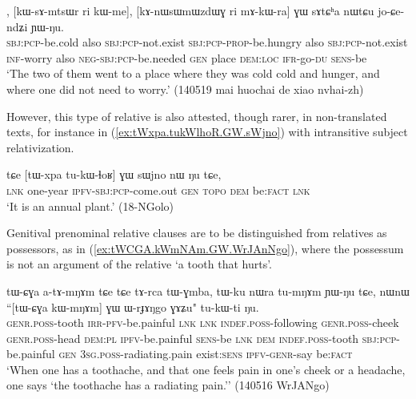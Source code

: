 \begin{exe}
\ex \label{ex:makWra.GW.sAtCha}
\gll [kɯ-ɣɤndʐo ri kɯ-me], [kɯ-sɤ-mtsɯr ri kɯ-me], [kɤ-nɯsɯmɯzdɯɣ ri mɤ-kɯ-ra] ɣɯ sɤtɕʰa nɯtɕu jo-ɕe-ndʑi ɲɯ-ŋu. \\
\textsc{sbj}:\textsc{pcp}-be.cold also \textsc{sbj}:\textsc{pcp}-not.exist \textsc{sbj}:\textsc{pcp}-\textsc{prop}-be.hungry also \textsc{sbj}:\textsc{pcp}-not.exist \textsc{inf}-worry also \textsc{neg}-\textsc{sbj}:\textsc{pcp}-be.needed \textsc{gen} place \textsc{dem}:\textsc{loc} \textsc{ifr}-go-\textsc{du} \textsc{sens}-be \\
\glt  `The two of them went to a place where they was cold cold and hunger, and where one did not need to worry.' (140519 mai huochai de xiao nvhai-zh)
\end{exe}

However, this type of relative is also attested, though rarer, in non-translated texts, for instance in (\ref{ex:tWxpa.tukWlhoR.GW.sWjno}) with intransitive subject relativization.
 

\begin{exe}
\ex \label{ex:tWxpa.tukWlhoR.GW.sWjno}
\gll  tɕe [tɯ-xpa tu-kɯ-ɬoʁ] ɣɯ sɯjno nɯ ŋu tɕe, \\
\textsc{lnk} one-year \textsc{ipfv}-\textsc{sbj}:\textsc{pcp}-come.out \textsc{gen}  \textsc{topo} \textsc{dem} be:\textsc{fact} \textsc{lnk} \\
\glt  `It is an annual plant.' (18-NGolo)
\end{exe}

Genitival prenominal relative clauses are to be distinguished from relatives as possessors, as in (\ref{ex:tWCGA.kWmNAm.GW.WrJAnNgo}), where the possessum   is not an argument of the relative  `a tooth that hurts'. 

\begin{exe}
\ex \label{ex:tWCGA.kWmNAm.GW.WrJAnNgo}
\gll tɯ-ɕɣa a-tɤ-mŋɤm tɕe tɕe tɤ-rca tɯ-ɣmba, tɯ-ku nɯra tu-mŋɤm ɲɯ-ŋu tɕe,  nɯnɯ ``[tɯ-ɕɣa kɯ-mŋɤm] ɣɯ ɯ-rɟɤŋgo ɣɤʑu" tu-kɯ-ti ŋu. \\
\textsc{genr}.\textsc{poss}-tooth \textsc{irr}-\textsc{pfv}-be.painful \textsc{lnk} \textsc{lnk} \textsc{indef}.\textsc{poss}-following \textsc{genr}.\textsc{poss}-cheek \textsc{genr}.\textsc{poss}-head \textsc{dem}:\textsc{pl} \textsc{ipfv}-be.painful \textsc{sens}-be \textsc{lnk} \textsc{dem} \textsc{indef}.\textsc{poss}-tooth \textsc{sbj}:\textsc{pcp}-be.painful \textsc{gen} \textsc{3sg}.\textsc{poss}-radiating.pain exist:\textsc{sens} \textsc{ipfv}-\textsc{genr}-say be:\textsc{fact} \\
\glt `When one has a toothache, and that one feels pain in one's cheek or a headache, one says `the toothache has a radiating pain.'' (140516 WrJANgo)
\end{exe}

